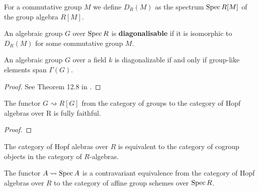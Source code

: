 \begin{definition}
  \label{0-spec-grp-alg}
  \leanok

  For a commutative group $M$ we define $D_R(M)$ as the spectrum $\operatorname{Spec} R[M]$ of the group algebra $R[M]$.
\end{definition}


\begin{definition}
  \label{0-diag}

  An algebraic group $G$ over $\operatorname{Spec} R$ is {\bf diagonalisable}
  if it is isomorphic to $D_R(M)$ for some commutative group $M$.
\end{definition}

\begin{theorem}
  \label{0-diag-iff-grp-like-span}
  An algebraic group $G$ over a field $k$ is diagonalizable
  if and only if group-like elements span $\Gamma(G)$.
\end{theorem}
\begin{proof}
  See Theorem 12.8 in \cite{Milne_2017}.
\end{proof}

\begin{proposition}
  \label{0-full-grp-hopf}
  \uses{}

  The functor $G \rightsquigarrow R[G]$
  from the category of groups
  to the category of Hopf algebras over R
  is fully faithful.
\end{proposition}
\begin{proof}

\end{proof}

\begin{proposition}
  \label{0-hopf-cogrp}
  \uses{}

  The category of Hopf alebras over $R$ is equivalent to the category of cogroup objects
  in the category of $R$-algebras.
\end{proposition}

\begin{theorem}
  \label{0-congr_hopf_affgrpsch}

  The functor $A\rightsquigarrow \operatorname{Spec} A$ is a contravariant equivalence
  from the category of Hopf algebras over $R$
  to the category of affine group schemes over $\operatorname{Spec} R$.
\end{theorem}

